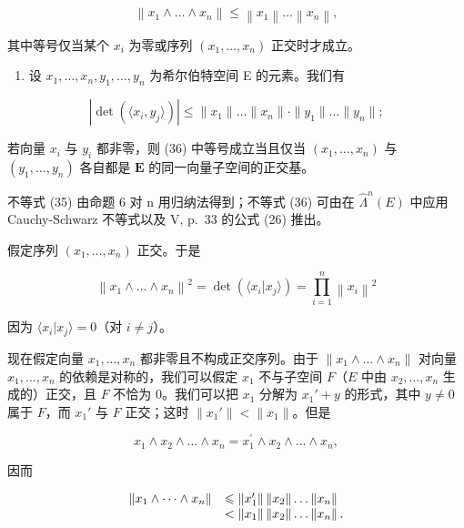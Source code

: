 \[
\left\| x _ {1} \wedge \dots \wedge x _ {n} \right\| \leqslant \left\| x _ {1} \right\| \dots \left\| x _ {n} \right\|,\tag{35}
\]

其中等号仅当某个 \(x_{i}\) 为零或序列 \((x_{1},\dots,x_{n})\) 正交时才成立。

\begin{enumerate}
\def\labelenumi{\alph{enumi})}
\setcounter{enumi}{1}
\tightlist
\item
  设 \(x_{1}, \ldots, x_{n}, y_{1}, \ldots, y_{n}\) 为希尔伯特空间 E 的元素。我们有
\end{enumerate}

\[
\left| \det (\langle x _ {i}, y _ {j} \rangle) \right| \leqslant \| x _ {1} \| \dots \| x _ {n} \| \cdot \| y _ {1} \| \dots \| y _ {n} \|;\tag{36}
\]

若向量 \(x_{i}\) 与 \(y_{i}\) 都非零，则 (36) 中等号成立当且仅当 \((x_{1},\ldots ,x_{n})\) 与 \((y_{1},\dots,y_{n})\) 各自都是 \(\mathbf{E}\) 的同一向量子空间的正交基。

不等式 (35) 由命题 6 对 n 用归纳法得到；不等式 (36) 可由在 \(\hat{\Lambda}^{n}(E)\) 中应用 Cauchy-Schwarz 不等式以及 V, p.~33 的公式 (26) 推出。

假定序列 \((x_{1},\dots,x_{n})\) 正交。于是

\[
\left\| x _ {1} \wedge \dots \wedge x _ {n} \right\| ^ {2} = \det (\langle x _ {i} | x _ {j} \rangle) = \prod_ {i = 1} ^ {n} \left\| x _ {i} \right\| ^ {2}
\]

因为 \(\langle x_i|x_j\rangle = 0\)（对 \(i\neq j\)）。

现在假定向量 \(x_{1}, \ldots, x_{n}\) 都非零且不构成正交序列。由于 \(\| x_{1} \wedge \ldots \wedge x_{n} \|\) 对向量 \(x_{1}, \ldots, x_{n}\) 的依赖是对称的，我们可以假定 \(x_{1}\) 不与子空间 \(F\)（\(E\) 中由 \(x_{2}, \ldots, x_{n}\) 生成的）正交，且 \(F\) 不恰为 0。我们可以把 \(x_{1}\) 分解为 \(x_{1}' + y\) 的形式，其中 \(y \neq 0\) 属于 \(F\)，而 \(x_{1}'\) 与 \(F\) 正交；这时 \(\| x_{1}' \| < \| x_{1} \|\)。但是

\[
x _ {1} \wedge x _ {2} \wedge \ldots \wedge x _ {n} = x _ {1} ^ {\prime} \wedge x _ {2} \wedge \ldots \wedge x _ {n},
\]

因而

\[
\begin{array}{r l} \left\| x _ {1} \wedge \dots \wedge x _ {n} \right\| & \leqslant \left\| x _ {1} ^ {\prime} \right\| \left\| x _ {2} \right\| \dots \left\| x _ {n} \right\| \\ & <   \left\| x _ {1} \right\| \left\| x _ {2} \right\| \dots \left\| x _ {n} \right\|. \end{array}
\]

